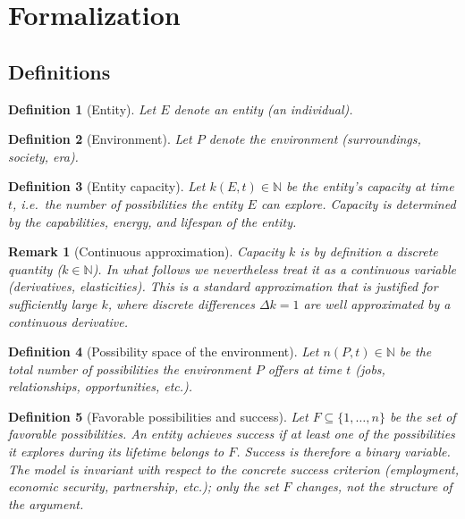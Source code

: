 \documentclass[12pt,a4paper]{article}
\newtheorem{definition}{Definition}[section]
\newtheorem{remark}{Remark}[section]
\begin{document}
\section{Formalization}

\subsection{Definitions}

\begin{definition}[Entity]
Let $E$ denote an entity (an individual).
\end{definition}

\begin{definition}[Environment]
Let $P$ denote the environment (surroundings, society, era).
\end{definition}

\begin{definition}[Entity capacity]
Let $k(E, t) \in \mathbb{N}$ be the \emph{entity's capacity} at time $t$, i.e.\ the number of possibilities the entity $E$ can explore. Capacity is determined by the capabilities, energy, and lifespan of the entity.
\end{definition}

\begin{remark}[Continuous approximation]
Capacity $k$ is by definition a discrete quantity ($k \in \mathbb{N}$). In what follows we nevertheless treat it as a continuous variable (derivatives, elasticities). This is a standard approximation that is justified for sufficiently large $k$, where discrete differences $\Delta k = 1$ are well approximated by a continuous derivative.
\end{remark}

\begin{definition}[Possibility space of the environment]
Let $n(P, t) \in \mathbb{N}$ be the total number of possibilities the environment $P$ offers at time $t$ (jobs, relationships, opportunities, etc.).
\end{definition}

\begin{definition}[Favorable possibilities and success]
Let $F \subseteq \{1, \dots, n\}$ be the set of \emph{favorable possibilities}. An entity achieves \emph{success} if at least one of the possibilities it explores during its lifetime belongs to $F$. Success is therefore a binary variable. The model is invariant with respect to the concrete success criterion (employment, economic security, partnership, etc.); only the set $F$ changes, not the structure of the argument.
\end{definition}
\end{document}
